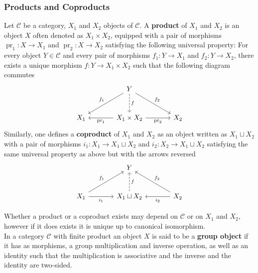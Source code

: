\documentclass{article}
\theoremstyle{plain}
\theoremstyle{definition}
\DeclareMathOperator{\pr}{pr}
\begin{document}
\subsubsection*{Products and Coproducts}

Let $\mathcal{C}$ be a category, $X_1$ and $X_2$ objects of $\mathcal{C}$.
A \textbf{product} of $X_1$ and $X_2$ is an object $X$ often denoted as $X_1\times X_2$, equipped with a pair of morphisms $\pr_1:X \rightarrow X_1$ and $\pr_2:X\rightarrow X_2$ satisfying the following universal property:
For every object $Y\in \mathcal{C}$ and every pair of morphisms $f_1:Y\rightarrow X_1$ and $f_2:Y\rightarrow X_2$, there exists a unique morphism $f:Y\rightarrow X_1\times X_2$ such that the following diagram commutes
\[
\begin{tikzcd}[column sep=large, row sep = large]
        & Y \arrow[d, dashed, "f"] \arrow[dr, "f_2"] \arrow[dl, "f_1"']&\\
        X_1 & X_1\times X_2 \arrow[l, "\pr_1"]\arrow[r, "\pr_2"'] & X_2
\end{tikzcd}
\]
Similarly, one defines a \textbf{coproduct} of $X_1$ and $X_2$ as an object written as $X_1 \sqcup X_2$ with a pair of morphisms $i_1: X_1\rightarrow X_1\sqcup X_2$ and $i_2: X_2\rightarrow X_1\sqcup X_2$ satisfying the same universal property as above but with the arrows reversed 
\[
\begin{tikzcd}[column sep=large, row sep = large]
        & Y   &\\
        X_1\arrow[ur, "f_1"] \arrow[r, "i_1"'] & 
        X_1\sqcup X_2 \arrow[u, dashed, "f"'] 
         & 
        X_2 \arrow[ul, "f_2"'] \arrow[l, "i_2"]
\end{tikzcd}
\]
 
\noindent Whether a product or a coproduct exists may depend on $\mathcal{C}$ or on $X_1$ and $X_2$, however if it does exists it is unique up to canonical isomorphism.\\
\noindent In a category $\mathcal{C}$ with finite product an object $X$ is said to be a \textbf{group object} if it has as morphisms, a group multiplication and inverse operation, as well as an identity such that the multiplication is associative and the inverse and the identity are two-sided.



\end{document}
